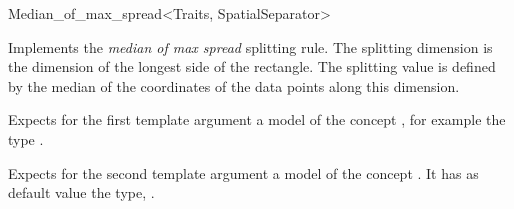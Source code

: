 

\begin{ccRefFunctionObjectClass}{Median_of_max_spread<Traits, SpatialSeparator>}

\ccDefinition
Implements the {\em median of max spread} splitting rule.
The splitting dimension is the dimension of the longest side of the rectangle.
The splitting value is defined by the median of the coordinates of the data points
along this dimension.


\ccParameters

Expects for the first template argument a model of
the concept , for example
the type . 

Expects for the second template argument a model of the concept . It has as default value
the type, .



\ccIsModel



\ccCreation
{}  %


\ccSeeAlso

\\


\end{ccRefFunctionObjectClass}


